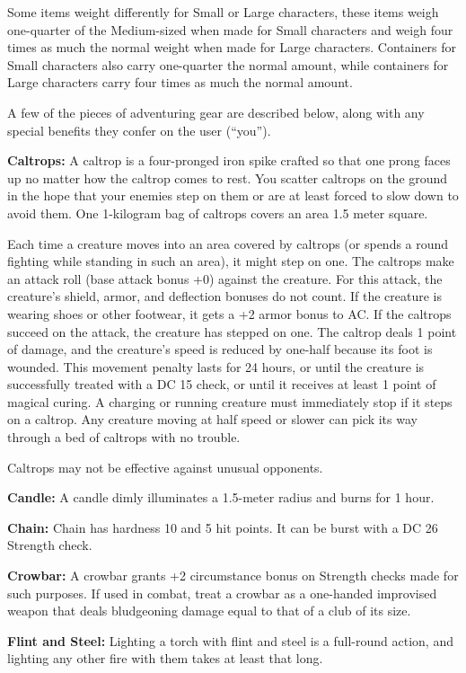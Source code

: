 Some items weight differently for Small or Large characters, these items weigh one-quarter of the Medium-sized when made for Small characters and weigh four times as much the normal weight when made for Large characters. Containers for Small characters also carry one-quarter the normal amount, while containers for Large characters carry four times as much the normal amount.

A few of the pieces of adventuring gear are described below, along with any special benefits they confer on the user (``you'').


\textbf{Caltrops:} A caltrop is a four-pronged iron spike crafted so that one prong faces up no matter how the caltrop comes to rest. You scatter caltrops on the ground in the hope that your enemies step on them or are at least forced to slow down to avoid them. One 1-kilogram bag of caltrops covers an area 1.5 meter square.

Each time a creature moves into an area covered by caltrops (or spends a round fighting while standing in such an area), it might step on one. The caltrops make an attack roll (base attack bonus +0) against the creature. For this attack, the creature's shield, armor, and deflection bonuses do not count. If the creature is wearing shoes or other footwear, it gets a +2 armor bonus to AC. If the caltrops succeed on the attack, the creature has stepped on one. The caltrop deals 1 point of damage, and the creature's speed is reduced by one-half because its foot is wounded. This movement penalty lasts for 24 hours, or until the creature is successfully treated with a DC 15  check, or until it receives at least 1 point of magical curing. A charging or running creature must immediately stop if it steps on a caltrop. Any creature moving at half speed or slower can pick its way through a bed of caltrops with no trouble.

Caltrops may not be effective against unusual opponents.

\textbf{Candle:} A candle dimly illuminates a 1.5-meter radius and burns for 1 hour.

\textbf{Chain:} Chain has hardness 10 and 5 hit points. It can be burst with a DC 26 Strength check.

\textbf{Crowbar:} A crowbar grants +2 circumstance bonus on Strength checks made for such purposes. If used in combat, treat a crowbar as a one-handed improvised weapon that deals bludgeoning damage equal to that of a club of its size.

\textbf{Flint and Steel:} Lighting a torch with flint and steel is a full-round action, and lighting any other fire with them takes at least that long.

